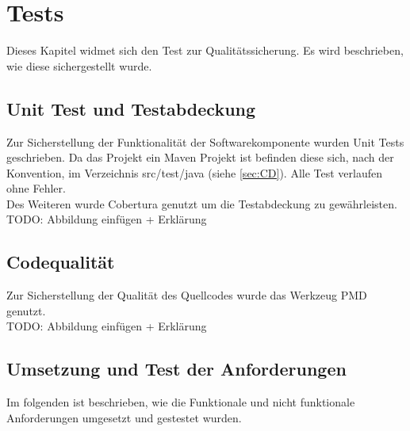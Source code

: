 \documentclass[a4paper]{article}
\begin{document}
	\newpage
	\section{Tests}
	
	Dieses Kapitel widmet sich den Test zur Qualitätssicherung. Es wird beschrieben,
	wie diese sichergestellt wurde.
	
	\subsection{Unit Test und Testabdeckung}
	
	Zur Sicherstellung der Funktionalität der Softwarekomponente wurden Unit Tests
	geschrieben. Da das Projekt ein Maven Projekt ist befinden diese sich, nach
	der Konvention, im Verzeichnis src/test/java (siehe \autoref{sec:CD}). Alle
	Test verlaufen ohne Fehler. \\
	
	Des Weiteren wurde Cobertura genutzt um die Testabdeckung zu gewährleisten. \\
	
  	TODO: Abbildung einfügen + Erklärung
	
	\subsection{Codequalität}
	\label{sec:pmd}
	
	Zur Sicherstellung der Qualität des Quellcodes wurde das Werkzeug PMD genutzt. \\
	
	TODO: Abbildung einfügen + Erklärung
	
	\subsection{Umsetzung und Test der Anforderungen }
	Im folgenden ist beschrieben, wie die Funktionale und nicht funktionale
	Anforderungen umgesetzt und gestestet wurden.
	
\end{document}
